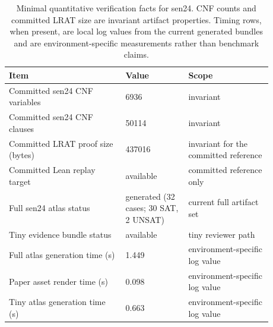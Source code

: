 \begin{table}[t]
\centering
\small
\begin{tabular}{p{0.39\linewidth} p{0.21\linewidth} p{0.28\linewidth}}
\toprule
Item & Value & Scope \\
\midrule
Committed sen24 CNF variables & 6936 & invariant \\
Committed sen24 CNF clauses & 50114 & invariant \\
Committed LRAT proof size (bytes) & 437016 & invariant for the committed reference \\
Committed Lean replay target & available & committed reference only \\
Full sen24 atlas status & generated (32 cases; 30 SAT, 2 UNSAT) & current full artifact set \\
Tiny evidence bundle status & available & tiny reviewer path \\
Full atlas generation time (s) & 1.449 & environment-specific log value \\
Paper asset render time (s) & 0.098 & environment-specific log value \\
Tiny atlas generation time (s) & 0.663 & environment-specific log value \\
\bottomrule
\end{tabular}
\caption{Minimal quantitative verification facts for sen24. CNF counts and committed LRAT size are invariant artifact properties. Timing rows, when present, are local log values from the current generated bundles and are environment-specific measurements rather than benchmark claims.}
\label{tab:sen24-verification-stats}
\end{table}
